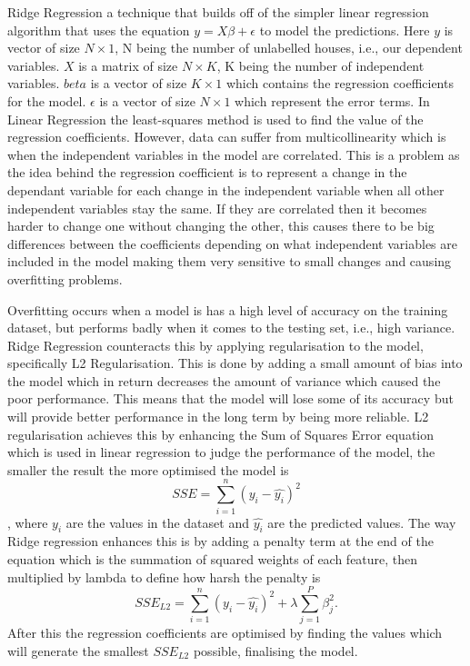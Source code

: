 Ridge Regression a technique that builds off of the simpler linear regression algorithm that uses the equation \(y=X\beta+\epsilon\) to model the predictions. Here \(y\) is vector of size \(N\times1\), N being the number of unlabelled houses, i.e., our dependent variables. \(X\) is a matrix of size \(N\times K\), K being the number of independent variables. \(beta\) is a vector of size \(K\times1\) which contains the regression coefficients for the model. \(\epsilon\) is a vector of size \(N\times1\) which represent the error terms.\cite{Adam_Hayes, Marco_Taboga} In Linear Regression the least-squares method is used to find the value of the regression coefficients. However, data can suffer from multicollinearity which is when the independent variables in the model are correlated. This is a problem as the idea behind the regression coefficient is to represent a change in the dependant variable for each change in the independent variable when all other independent variables stay the same. If they are correlated then it becomes harder to change one without changing the other, this causes there to be big differences between the coefficients depending on what independent variables are included in the model making them very sensitive to small changes and causing overfitting problems.\cite{Jim_Frost} 

Overfitting occurs when a model is has a high level of accuracy on the training dataset, but performs badly when it comes to the testing set, i.e., high variance.\cite{Jaiganesh_Nagidi} Ridge Regression counteracts this by applying regularisation to the model, specifically L2 Regularisation. This is done by adding a small amount of bias into the model which in return decreases the amount of variance which caused the poor performance. This means that the model will lose some of its accuracy but will provide better performance in the long term by being more reliable.\cite{Cory_Maklin} L2 regularisation achieves this by enhancing the Sum of Squares Error equation which is used in linear regression to judge the performance of the model, the smaller the result the more optimised the model is \[ SSE=\sum_{i=1}^{n} (y_i-\hat{y_i})^{2} \], where \(y_i\) are the values in the dataset and \(\hat{y_i}\) are the predicted values\cite{Ted_Hessing, Saed_Sayad_RR}. The way Ridge regression enhances this is by adding a penalty term at the end of the equation which is the summation of squared weights of each feature, then multiplied by lambda to define how harsh the penalty is\cite{Kerem_Kargin} \[ SSE_{L2}=\sum_{i=1}^{n} (y_i-\hat{y_i})^{2} +\lambda\sum_{j=1}^P \beta_j^2.\] After this the regression coefficients are optimised by finding the values which will generate the smallest \(SSE_{L2}\) possible, finalising the model.

